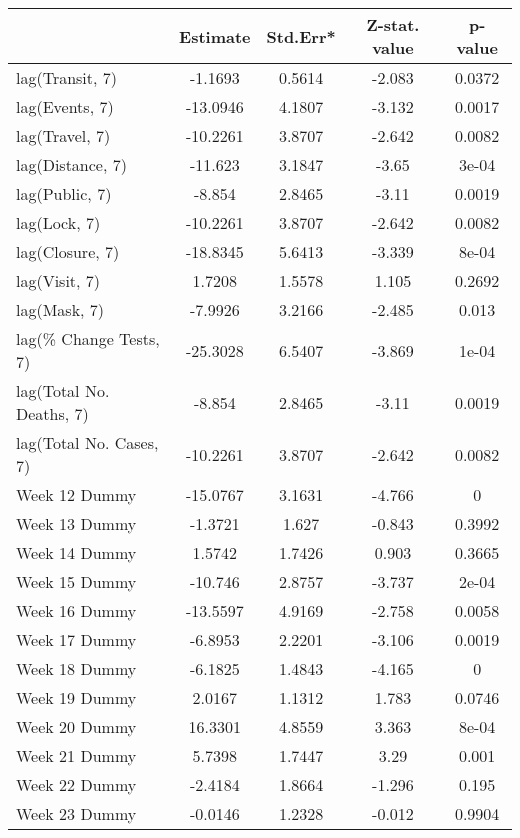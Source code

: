 \begingroup\tiny
\begin{longtable}{lcccc}
  \toprule
 & Estimate & Std.Err* & Z-stat. value & p-value \\ 
  \midrule
lag(Transit, 7) & -1.1693 & 0.5614 & -2.083 & 0.0372 \\ 
  lag(Events, 7) & -13.0946 & 4.1807 & -3.132 & 0.0017 \\ 
  lag(Travel, 7) & -10.2261 & 3.8707 & -2.642 & 0.0082 \\ 
  lag(Distance, 7) & -11.623 & 3.1847 & -3.65 & 3e-04 \\ 
  lag(Public, 7) & -8.854 & 2.8465 & -3.11 & 0.0019 \\ 
  lag(Lock, 7) & -10.2261 & 3.8707 & -2.642 & 0.0082 \\ 
  lag(Closure, 7) & -18.8345 & 5.6413 & -3.339 & 8e-04 \\ 
  lag(Visit, 7) & 1.7208 & 1.5578 & 1.105 & 0.2692 \\ 
  lag(Mask, 7) & -7.9926 & 3.2166 & -2.485 & 0.013 \\ 
  lag(\% Change Tests, 7) & -25.3028 & 6.5407 & -3.869 & 1e-04 \\ 
  lag(Total No. Deaths, 7) & -8.854 & 2.8465 & -3.11 & 0.0019 \\ 
  lag(Total No. Cases, 7) & -10.2261 & 3.8707 & -2.642 & 0.0082 \\ 
  Week 12 Dummy & -15.0767 & 3.1631 & -4.766 & 0 \\ 
  Week 13 Dummy & -1.3721 & 1.627 & -0.843 & 0.3992 \\ 
  Week 14 Dummy & 1.5742 & 1.7426 & 0.903 & 0.3665 \\ 
  Week 15 Dummy & -10.746 & 2.8757 & -3.737 & 2e-04 \\ 
  Week 16 Dummy & -13.5597 & 4.9169 & -2.758 & 0.0058 \\ 
  Week 17 Dummy & -6.8953 & 2.2201 & -3.106 & 0.0019 \\ 
  Week 18 Dummy & -6.1825 & 1.4843 & -4.165 & 0 \\ 
  Week 19 Dummy & 2.0167 & 1.1312 & 1.783 & 0.0746 \\ 
  Week 20 Dummy & 16.3301 & 4.8559 & 3.363 & 8e-04 \\ 
  Week 21 Dummy & 5.7398 & 1.7447 & 3.29 & 0.001 \\ 
  Week 22 Dummy & -2.4184 & 1.8664 & -1.296 & 0.195 \\ 
  Week 23 Dummy & -0.0146 & 1.2328 & -0.012 & 0.9904 \\ 

\end{longtable}
